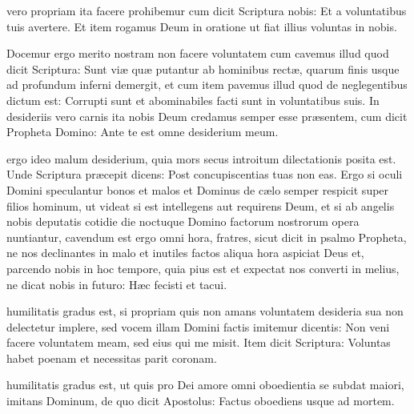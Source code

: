 \documentclass[fontsize=9pt,paper=A6,twoside,BCOR=1mm,DIV=22,headinclude]{scrarticle}
\begin{document}
\begin{multicols}{2}
{%
 vero propriam ita facere prohibemur cum dicit Scriptura nobis: Et a voluntatibus tuis avertere. Et item rogamus Deum in oratione ut fiat illius voluntas in nobis.

Docemur ergo merito nostram non facere voluntatem cum cavemus illud quod dicit Scriptura: Sunt viæ quæ putantur ab hominibus rectæ, quarum finis usque ad profundum inferni demergit, et cum item pavemus illud quod de neglegentibus dictum est: Corrupti sunt et abominabiles facti sunt in voluntatibus suis. In desideriis vero carnis ita nobis Deum credamus semper esse præsentem, cum dicit Propheta Domino: Ante te est omne desiderium meum.

}

 ergo ideo malum desiderium, quia mors secus introitum dilectationis posita est. Unde Scriptura præcepit dicens: Post concupiscentias tuas non eas. Ergo si oculi Domini speculantur bonos et malos et Dominus de cælo semper respicit super filios hominum, ut videat si est intellegens aut requirens Deum, et si ab angelis nobis deputatis cotidie die noctuque Domino factorum nostrorum opera nuntiantur, cavendum est ergo omni hora, fratres, sicut dicit in psalmo Propheta, ne nos declinantes in malo et inutiles factos aliqua hora aspiciat Deus et, parcendo nobis in hoc tempore, quia pius est et expectat nos converti in melius, ne dicat nobis in futuro: Hæc fecisti et tacui.

{
 humilitatis gradus est, si propriam quis non amans voluntatem desideria sua non delectetur implere, sed vocem illam Domini factis imitemur dicentis: Non veni facere voluntatem meam, sed eius qui me misit. Item dicit Scriptura: Voluntas habet poenam et necessitas parit coronam.

}

 humilitatis gradus est, ut quis pro Dei amore omni oboedientia se subdat maiori, imitans Dominum, de quo dicit Apostolus: Factus oboediens usque ad mortem.


\end{multicols}
\end{document}
